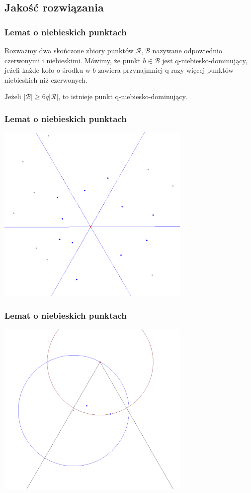 \documentclass[polish, t,10pt]{beamer}
\begin{document}
\subsection{Jakość rozwiązania}
\begin{frame}
    \frametitle{Lemat o niebieskich punktach}
    \begin{definition}
        Rozważmy dwa skończone zbiory punktów $\mathcal{R}, \mathcal{B}$ nazywane odpowiednio czerwonymi i
        niebieskimi. Mówimy, że punkt $b \in \mathcal{B}$ jest q-niebiesko-dominujący, jeżeli każde koło
        o środku w $b$ zawiera przynajmniej q razy więcej punktów niebieskich niż czerwonych.
    \end{definition}
    \vfill
    \begin{lemma}
        Jeżeli $|\mathcal{B}| \ge 6q|\mathcal{R}|$, to istnieje punkt q-niebiesko-dominujący.
    \end{lemma}
\end{frame}

\begin{frame}
    \frametitle{Lemat o niebieskich punktach}
    \centering
    \includegraphics[width=0.7\textwidth]{pictures/blue-dominant-1.png}
\end{frame}

\begin{frame}
    \frametitle{Lemat o niebieskich punktach}
    \centering
    \includegraphics[width=0.7\textwidth]{pictures/blue-dominant-2.png}
\end{frame}
\end{document}
